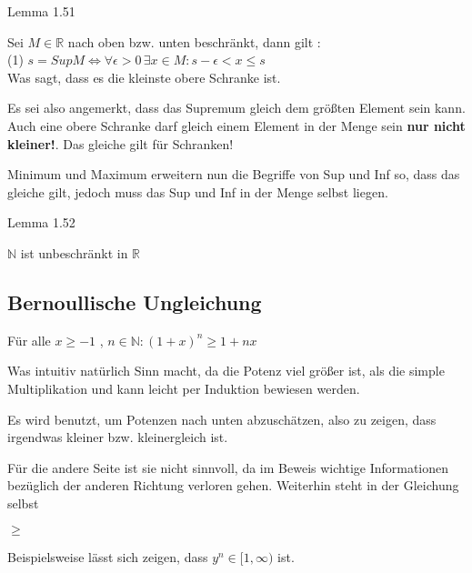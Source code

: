 \documentclass[headsepline,12pt,a4paper]{scrartcl}
\begin{document}
\begin{center}
\item[Lemma 1.51]
\end{center}
\item Sei $ M \in \mathbb{R} $ nach oben bzw. unten beschränkt, dann gilt :  \\
(1)  $ s = Sup M \Leftrightarrow \forall \epsilon > 0 \, \exists x \in M : s - \epsilon < x \leq s $ \\
Was sagt, dass es die kleinste obere Schranke ist.
\item Es sei also angemerkt, dass das Supremum gleich dem größten Element sein kann. Auch eine obere Schranke darf gleich einem Element in der Menge sein \textbf{nur nicht kleiner!}. Das gleiche gilt für Schranken! 
\item Minimum und Maximum erweitern nun die Begriffe von Sup und Inf so, dass das gleiche gilt, jedoch muss das Sup und Inf in der Menge selbst liegen.


\begin{center}
\item[Lemma 1.52]
\end{center}
\item $ \mathbb{N} $ ist unbeschränkt in $\mathbb{R}$ 

\newpage

\subsection*{Bernoullische Ungleichung}

\item Für alle $ x \geq -1 $ , $ n\in \mathbb{N} : (1+x)^n \geq  1+nx $ 
\item Was intuitiv natürlich Sinn macht, da die Potenz viel größer ist, als die simple Multiplikation und kann leicht per Induktion bewiesen werden.
\item Es wird benutzt, um Potenzen nach unten abzuschätzen, also zu zeigen, dass irgendwas kleiner bzw. kleinergleich ist.
\item Für die andere Seite ist sie nicht sinnvoll, da im Beweis wichtige Informationen bezüglich der anderen Richtung verloren gehen. Weiterhin steht in der Gleichung selbst \begin{center}
$\geq $
\end{center} 
\item Beispielsweise lässt sich zeigen, dass $ y^{n} \in [1,\infty) $ ist.
\end{document}

